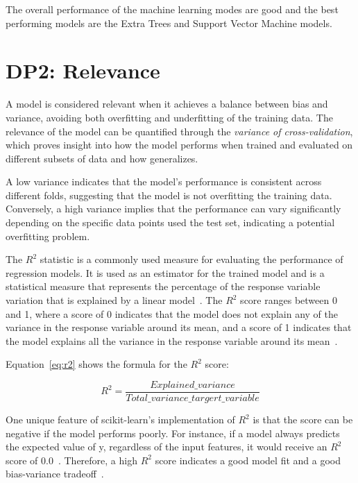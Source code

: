 The overall performance of the machine learning modes are good and the best performing models are the Extra Trees and
Support Vector Machine models.


\section{DP2: Relevance}\label{sec:relevance}

A model is considered relevant when it achieves a balance between bias and
variance, avoiding both overfitting and underfitting of the training data.
The relevance of the model can be quantified through the \textit{variance of cross-validation}, which proves insight
into how the model performs when trained and
evaluated on different subsets of data and how generalizes.

A low variance indicates that the model's performance is consistent across
different folds, suggesting that the model is not overfitting the training data.
Conversely, a high variance implies that the performance can vary significantly
depending on the specific data points used the test set, indicating a potential
overfitting problem.

The $R^2$ statistic is a commonly used measure for evaluating the performance of regression models.
It is used as an estimator for the trained model and is a statistical measure that represents the percentage of the
response variable variation that is explained by a linear
model~\cite[p. 43]{muller_introductionmachinelearning_2016}.
The $R^2$ score ranges between 0 and 1, where a score of 0 indicates that the model does not explain any of the
variance in the response variable around its mean, and a score of 1 indicates that the model explains all the
variance in the response variable around its mean~\cite[p. 43]{muller_introductionmachinelearning_2016}.


Equation~\eqref{eq:r2} shows the formula for the $R^2$ score:

\begin{equation}
    \label{eq:r2}
    R^2 = \frac{Explained\_variance}{Total\_variance\_targert\_variable}
\end{equation}

One unique feature of scikit-learn's implementation of $R^2$ is that the score can be negative if the model performs
poorly.
For instance, if a model always predicts the expected value of y, regardless of the input features, it would
receive an $R^2$ score of 0.0~\cite{_sklearnmetricsr2_}. Therefore, a high $R^2$ score indicates a good model fit and
a good bias-variance tradeoff~\cite[p. 43]{muller_introductionmachinelearning_2016}.

